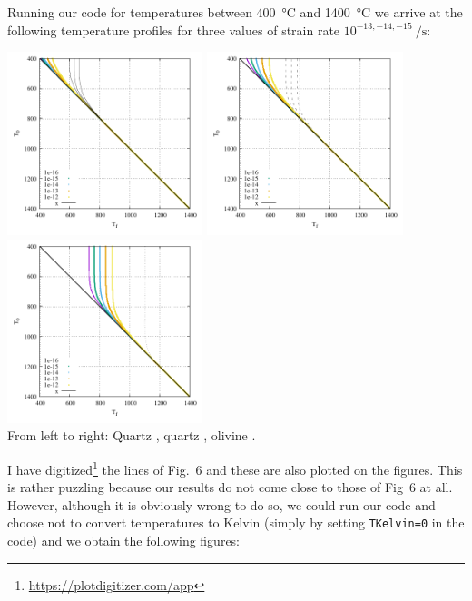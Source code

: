 Running our code for temperatures between 400~\si{\celsius} and 1400~\si{\celsius}
we arrive at the following temperature profiles for three values of strain rate 
$10^{-13,-14,-15}~\si{\per\second}$:

\begin{center}
\includegraphics[width=5.7cm]{python_codes/fieldstone_167/1kelvin/fig6.pdf}
\includegraphics[width=5.7cm]{python_codes/fieldstone_167/2kelvin/fig6.pdf}
\includegraphics[width=5.7cm]{python_codes/fieldstone_167/3kelvin/fig6.pdf}\\
{\captionfont From left to right: Quartz \cite{brko80}, quartz \cite{stsa94}, olivine \cite{brko80}.}
\end{center}

I have digitized\footnote{\url{https://plotdigitizer.com/app}} the lines of Fig.~6
and these are also plotted on the figures.
This is rather puzzling because our results do not come close to those of Fig~6 at all. 
However, although it is obviously wrong to do so, we could run our code and choose not 
to convert temperatures to Kelvin (simply by setting \lstinline|TKelvin=0| in the code) 
and we obtain the following figures:

